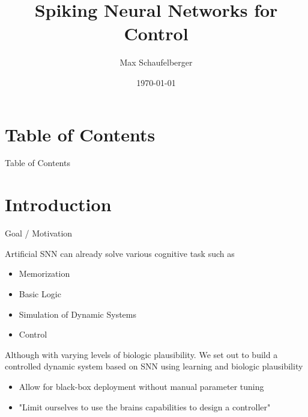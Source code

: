 \documentclass[17pt, t, lualatex]{beamer}
\title{Spiking Neural Networks for Control}
\date{\today}
\institute[KTH]{KTH Royal Institute of Technology}
\author{Max Schaufelberger}
\begin{document}
\inserttitlepage

\section*{Table of Contents}
\begin{frame}{Table of Contents}
	\tableofcontents
\end{frame}



\section{Introduction}\insertsectionpage

\begin{frame}{Goal / Motivation}

	Artificial SNN can already solve various cognitive task such as
	\begin{itemize}
		\item Memorization
		\item Basic Logic
		\item Simulation of Dynamic Systems
		\item Control
	\end{itemize}
	Although with varying levels of biologic plausibility.
	We set out to build a controlled dynamic system based on SNN using learning and biologic plausibility
	\begin{itemize}
		\item Allow for black-box deployment without manual parameter tuning\\
		\item "Limit ourselves to use the brains capabilities to design a controller"\\
	\end{itemize}
\end{frame}
\end{document}
